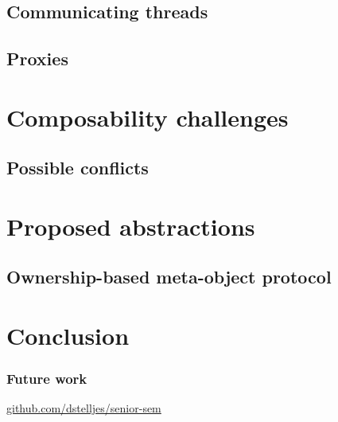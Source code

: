 \documentclass{beamer}
\begin{document}
  \begin{frame}
  \end{frame}

  \subsection{Communicating threads}

  \begin{frame}
  \end{frame}

  \subsection{Proxies}

  \begin{frame}
  \end{frame}

  \section{Composability challenges}

  \subsection{Possible conflicts}

  \section{Proposed abstractions}

  \subsection{Ownership-based meta-object protocol}

  \section{Conclusion}

  \begin{frame}
    \frametitle{Future work}
  \end{frame}

  \begin{frame}[standout]
    \centering

    \url{github.com/dstelljes/senior-sem}

    \vfill

    \ccbyncsa
  \end{frame}
 
\end{document}
